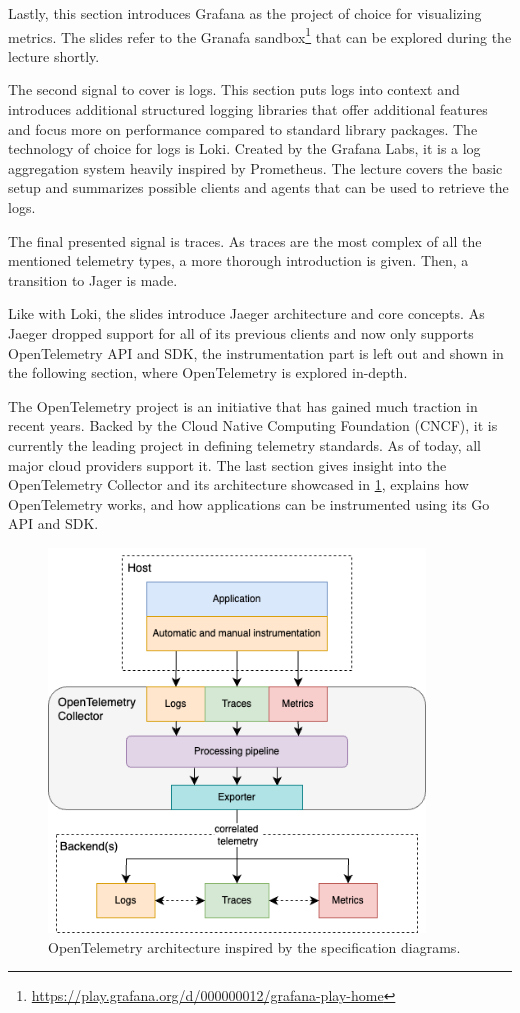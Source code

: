 \documentclass[
  digital,
  color,
  oneside,
  nosansbold,
  nocolorbold,
  nolof,
  nolot,
]{fithesis4}
\begin{document}
Lastly, this section introduces Grafana\cite{grafana} as the project of choice for visualizing metrics. The slides refer to the Granafa sandbox\footnote{ \url{https://play.grafana.org/d/000000012/grafana-play-home}}
that can be explored during the lecture shortly.

The second signal to cover is logs. This section puts logs into context and introduces additional structured logging libraries that offer additional features and focus more on performance compared to standard library packages.
The technology of choice for logs is Loki\cite{loki}. Created by the Grafana Labs, it is a log aggregation system heavily inspired by Prometheus. The lecture covers the basic setup and summarizes possible clients and agents that can be used to retrieve the logs.

The final presented signal is traces. As traces are the most complex of all the mentioned telemetry types, a more thorough introduction is given. Then, a transition to Jager\cite{jaeger} is made.

Like with Loki, the slides introduce Jaeger architecture and core concepts. As Jaeger dropped support for all of its previous clients and now only supports OpenTelemetry API and SDK, the instrumentation part is left out and shown in the following section, where OpenTelemetry is explored in-depth.

The OpenTelemetry\cite{open-telemetry}
project is an initiative that has gained much traction in recent years. Backed by the Cloud Native Computing Foundation (CNCF)\cite{cncf},
it is currently the leading project in defining telemetry standards. As of today, all major cloud providers support it. The last section gives insight into the OpenTelemetry Collector and its architecture showcased in \cref{fig:otel}, explains how OpenTelemetry works, and how applications can be instrumented using its Go API and SDK.

\begin{figure}[H]
    \centering
    \includegraphics[width=10cm]{figures/opentelemetry-architecture.png}
    \caption{OpenTelemetry architecture inspired by the specification diagrams\cite{open-telemetry-spec}.}
    \label{fig:otel}
\end{figure}
\end{document}
